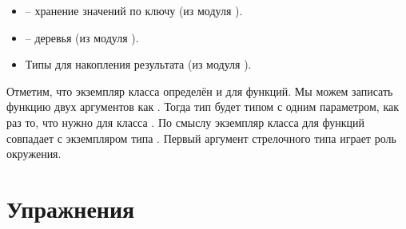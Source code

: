 \begin{itemize}

\item {} -- хранение значений по ключу 
(из модуля ).

\item {} -- деревья (из модуля ).

\item Типы для накопления результата (из модуля ).

\end{itemize}

Отметим, что экземпляр класса  определён 
и для функций. Мы можем записать функцию двух аргументов
 как . Тогда тип 
 будет типом с одним параметром, как раз то, что нужно для
класса . По смыслу экземпляр класса  
для функций совпадает с экземпляром типа . 
Первый аргумент стрелочного типа  играет роль окружения.

\section{Упражнения}

